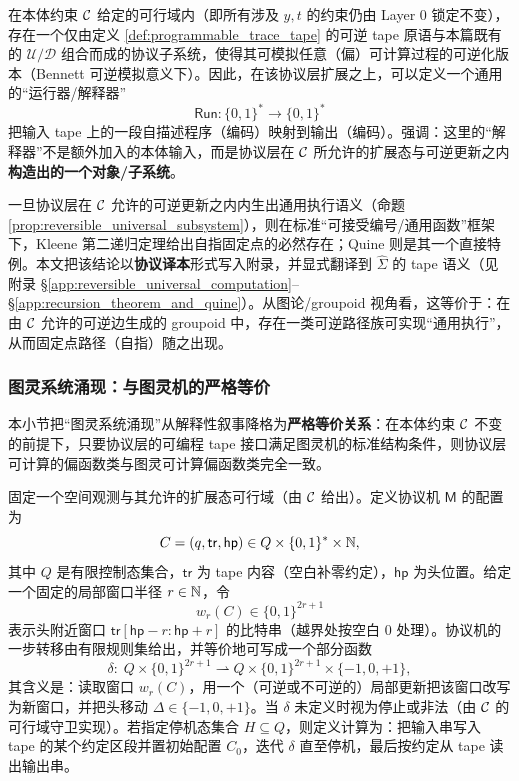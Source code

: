 \begin{proposition}\label{prop:reversible_universal_subsystem}
在本体约束 \(\mathcal{C}\) 给定的可行域内（即所有涉及 \(y,t\) 的约束仍由 Layer 0 锁定不变），存在一个仅由定义 \ref{def:programmable_trace_tape} 的可逆 tape 原语与本篇既有的 \(\mathcal U/\mathcal D\) 组合而成的协议子系统，使得其可模拟任意（偏）可计算过程的可逆化版本（Bennett 可逆模拟意义下）。因此，在该协议层扩展之上，可以定义一个通用的“运行器/解释器”
$$
\mathsf{Run}:\{0,1\}^\ast \to \{0,1\}^\ast
$$
把输入 tape 上的一段自描述程序（编码）映射到输出（编码）。强调：这里的“解释器”不是额外加入的本体输入，而是协议层在 \(\mathcal{C}\) 所允许的扩展态与可逆更新之内\textbf{构造出的一个对象/子系统}。
\end{proposition}

\begin{remark}\label{rem:why_universality_implies_quine}
一旦协议层在 \(\mathcal{C}\) 允许的可逆更新之内内生出通用执行语义（命题 \ref{prop:reversible_universal_subsystem}），则在标准“可接受编号/通用函数”框架下，Kleene 第二递归定理给出自指固定点的必然存在；Quine 则是其一个直接特例。本文把该结论以\textbf{协议译本}形式写入附录，并显式翻译到 \(\widehat\Sigma\) 的 tape 语义（见附录 \S\ref{app:reversible_universal_computation}--\S\ref{app:recursion_theorem_and_quine}）。从图论/groupoid 视角看，这等价于：在由 \(\mathcal{C}\) 允许的可逆边生成的 groupoid 中，存在一类可逆路径族可实现“通用执行”，从而固定点路径（自指）随之出现。
\end{remark}

\subsubsection{图灵系统涌现：与图灵机的严格等价}\label{subsubsec:turing_emergence_equivalence}
本小节把“图灵系统涌现”从解释性叙事降格为\textbf{严格等价关系}：在本体约束 \(\mathcal{C}\) 不变的前提下，只要协议层的可编程 tape 接口满足图灵机的标准结构条件，则协议层可计算的偏函数类与图灵可计算偏函数类完全一致。

\begin{definition}\label{def:protocol_machine}
固定一个空间观测与其允许的扩展态可行域（由 \(\mathcal{C}\) 给出）。定义协议机 \(\mathsf{M}\) 的配置为
$$
C=(q,\mathsf{tr},\mathsf{hp})\in Q\times \{0,1\}^\ast\times\mathbb{N},
$$
其中 \(Q\) 是有限控制态集合，\(\mathsf{tr}\) 为 tape 内容（空白补零约定），\(\mathsf{hp}\) 为头位置。给定一个固定的局部窗口半径 \(r\in\mathbb{N}\)，令
$$
w_r(C)\in\{0,1\}^{2r+1}
$$
表示头附近窗口 \(\mathsf{tr}[\mathsf{hp}-r:\mathsf{hp}+r]\) 的比特串（越界处按空白 \(0\) 处理）。协议机的一步转移由有限规则集给出，并等价地可写成一个部分函数
$$
\delta:\; Q\times\{0,1\}^{2r+1}\rightharpoonup Q\times\{0,1\}^{2r+1}\times\{-1,0,+1\},
$$
其含义是：读取窗口 \(w_r(C)\)，用一个（可逆或不可逆的）局部更新把该窗口改写为新窗口，并把头移动 \(\Delta\in\{-1,0,+1\}\)。当 \(\delta\) 未定义时视为停止或非法（由 \(\mathcal{C}\) 的可行域守卫实现）。若指定停机态集合 \(H\subseteq Q\)，则定义计算为：把输入串写入 tape 的某个约定区段并置初始配置 \(C_0\)，迭代 \(\delta\) 直至停机，最后按约定从 tape 读出输出串。
\end{definition}

